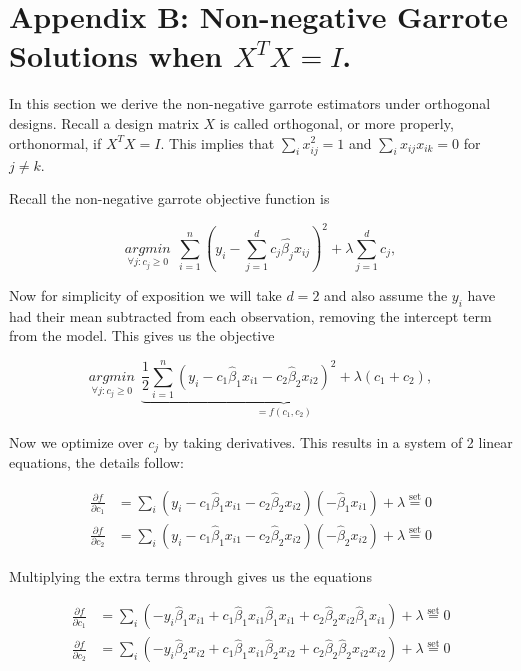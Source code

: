 \section*{Appendix B: Non-negative Garrote Solutions when $X^TX = I$.}\label{app_sec:B}

In this section we derive the non-negative garrote estimators under orthogonal designs. Recall a design matrix $X$ is called orthogonal, or more properly, orthonormal, if $X^TX=I$. This implies that $\sum_ix_{ij}^2=1$ and $\sum_ix_{ij}x_{ik}=0$ for $j\neq k$. 

Recall the non-negative garrote objective function is 

\begin{equation}\label{eqn:nn_garrote_obj}
\underset{\forall j: c_j\geq 0}{argmin}\ \ \sum_{i=1}^n(y_i -\sum_{j=1}^dc_j\hat{\beta_j}x_{ij})^2 + \lambda\sum_{j=1}^dc_j,
\end{equation}    

Now for simplicity of exposition we will take $d=2$ and also assume the $y_i$ have had their mean subtracted from each observation, removing the intercept term from the model. This gives us the objective 

\begin{equation}\label{eqn:nn_garroted=2}
\underset{\forall j: c_j\geq 0}{argmin}\ \ \underbrace{\frac{1}{2}\sum_{i=1}^n(y_i -c_1\hat{\beta}_1x_{i1}-c_2\hat{\beta}_2x_{i2})^2 + \lambda(c_1+c_2)}_{=f(c_1,c_2)},
\end{equation}    

Now we optimize over $c_j$ by taking derivatives. This results in a system of 2 linear equations, the details follow: 

\begin{align}
\frac{\partial f}{\partial c_1} &= \sum_i(y_i-c_1\hat{\beta}_1x_{i1}-c_2\hat{\beta}_2x_{i2})(-\hat{\beta}_1x_{i1}) + \lambda \overset{\text{set}}{=} 0\\
\frac{\partial f}{\partial c_2} &= \sum_i(y_i-c_1\hat{\beta}_1x_{i1}-c_2\hat{\beta}_2x_{i2})(-\hat{\beta}_2x_{i2}) +\lambda \overset{\text{set}}{=} 0
\end{align}

Multiplying the extra terms through gives us the equations

\begin{align}
\frac{\partial f}{\partial c_1} &=  \sum_i(-y_i\hat{\beta}_1x_{i1}+c_1\hat{\beta}_1x_{i1}\hat{\beta}_1x_{i1}+c_2\hat{\beta}_2x_{i2}\hat{\beta}_1x_{i1})+\lambda \overset{\text{set}}{=} 0\\
\frac{\partial f}{\partial c_2} &= \sum_i(-y_i\hat{\beta}_2x_{i2}+c_1\hat{\beta}_1x_{i1}\hat{\beta}_2x_{i2}+c_2\hat{\beta}_2\hat{\beta}_2x_{i2}x_{i2}) +\lambda\overset{\text{set}}{=} 0
\end{align}

